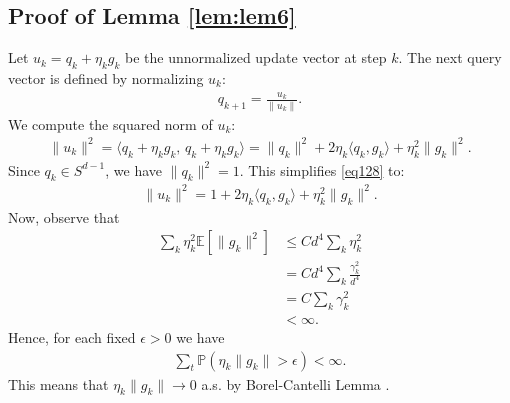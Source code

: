 \documentclass[11pt,a4paper]{article}
\theoremstyle{definition}
\begin{document}
\subsection{Proof of Lemma \ref{lem:lem6}}
Let $u_k = q_k + \eta_k g_k$ be the unnormalized update vector at step $k$. The next query vector is defined by normalizing $u_k$:
\begin{align}
q_{k+1} = \frac{u_k}{\|u_k\|}.
\end{align}
We compute the squared norm of $u_k$:
\begin{align}
\|u_k\|^2 = \langle q_k + \eta_k g_k, \, q_k + \eta_k g_k \rangle = \|q_k\|^2 + 2 \eta_k \langle q_k, g_k \rangle + \eta_k^2 \|g_k\|^2 \label{eq128}.
\end{align}
Since $q_k \in S^{d-1}$, we have $\|q_k\|^2 = 1$. This simplifies \eqref{eq128} to:
\begin{align}
\|u_k\|^2 = 1 + 2 \eta_k \langle q_k, g_k \rangle + \eta_k^2 \|g_k\|^2. 
\end{align}
Now, observe that
\begin{align}
\sum_k  \eta_k^2 \mathbb{E}[\|g_k\|^2]& \leq Cd^4  \sum_k  \eta_k^2 \nonumber \\
&=  Cd^4 \sum_k \frac{\gamma_k^2}{d^4} \nonumber \\
&= C \sum_k \gamma_k^2 \nonumber \\
& < \infty.  
\end{align}
Hence, for each fixed $\epsilon >0$ we have
\begin{align}
\sum_t \mathbb{P}(\eta_k \|g_k\|>\epsilon) < \infty. 
\end{align}
This means that $\eta_k \|g_k\| \to 0$ a.s. by Borel-Cantelli Lemma \cite{Billingsley}. 
\end{document}
